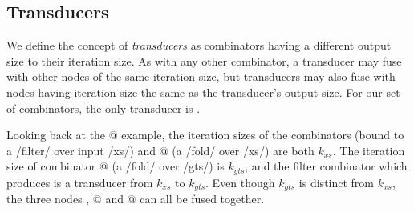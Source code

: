 


\subsection{Transducers}

We define the concept of \emph{transducers} as combinators having a different output size to their iteration size.
As with any other combinator, a transducer may fuse with other nodes of the same iteration size, but transducers may also fuse with nodes having iteration size the same as the transducer's output size.
For our set of combinators, the only transducer is \Hs@filter@.

Looking back at the @ example, the iteration sizes of the combinators \Hs@gts@ (bound to a \Hs/filter/ over input \Hs/xs/) and @ (a \Hs/fold/ over \Hs/xs/) are both $k_{xs}$.
The iteration size of combinator @ (a \Hs/fold/ over \Hs/gts/) is $k_{gts}$, and the filter combinator which produces \Hs@gts@ is a transducer from $k_{xs}$ to $k_{gts}$. 
Even though $k_{gts}$ is distinct from $k_{xs}$, the three nodes \Hs@gts@, @ and @ can all be fused together.

